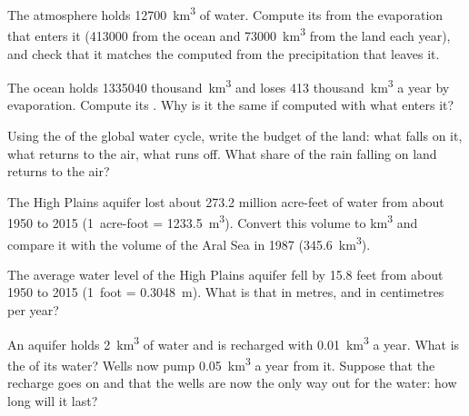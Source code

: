 \begin{exercise}[$\star\star$]\label{exo:g10:freshwater-resources:6}
The atmosphere holds \num{12700}~\unit{km^3} of water. Compute its  from the evaporation that enters it (\num{413000} from the ocean and
\num{73000}~\unit{km^3} from the land each year), and check that it matches
the  computed from the precipitation that leaves it.
\end{exercise}

\begin{exercise}[$\star\star$]\label{exo:g10:freshwater-resources:7}
The ocean holds \num{1335040} thousand~\unit{km^3} and loses
\num{413} thousand~\unit{km^3} a year by evaporation. Compute its . Why is it the same if computed with what enters it?
\end{exercise}

\begin{exercise}[$\star\star$]\label{exo:g10:freshwater-resources:8}
Using the  of the global water cycle, write the budget of the land: what
falls on it, what returns to the air, what runs off. What share of the rain
falling on land returns to the air?
\end{exercise}

\begin{exercise}[$\star\star$]\label{exo:g10:freshwater-resources:9}
The High Plains aquifer lost about \num{273.2} million acre-feet of water from
about 1950 to 2015 (\num{1}~acre-foot = \qty{1233.5}{m^3}). Convert
this volume to \unit{km^3} and compare it with the volume of the Aral Sea in
1987 (\qty{345.6}{km^3}).
\end{exercise}

\begin{exercise}[$\star\star$]\label{exo:g10:freshwater-resources:10}
The average water level of the High Plains aquifer fell by \num{15.8} feet
from about 1950 to 2015 (\num{1}~foot = \qty{0.3048}{m}). What is that in
metres, and in centimetres per year?
\end{exercise}

\begin{exercise}[$\star\star$]\label{exo:g10:freshwater-resources:11}
An aquifer holds \qty{2}{km^3} of water and is recharged with
\qty{0.01}{km^3} a year. What is the  of its water? Wells now
pump \qty{0.05}{km^3} a year from it. Suppose that the recharge goes on and
that the wells are now the only way out for the water: how long will it
last?
\end{exercise}

